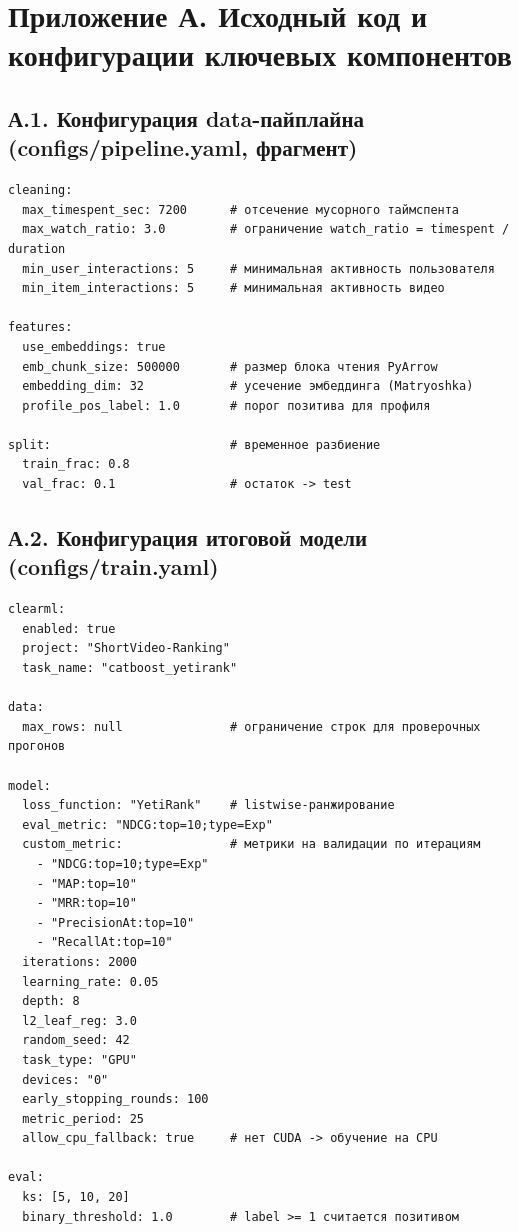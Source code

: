 \newpage
\section*{Приложение А. Исходный код и конфигурации ключевых компонентов}

\subsection*{А.1. Конфигурация data-пайплайна (configs/pipeline.yaml, фрагмент)}

\begin{lstlisting}[language={}, caption={Ключевые секции конфигурации data-этапов}, label={lst:pipeline-yaml}]
cleaning:
  max_timespent_sec: 7200      # отсечение мусорного таймспента
  max_watch_ratio: 3.0         # ограничение watch_ratio = timespent / duration
  min_user_interactions: 5     # минимальная активность пользователя
  min_item_interactions: 5     # минимальная активность видео

features:
  use_embeddings: true
  emb_chunk_size: 500000       # размер блока чтения PyArrow
  embedding_dim: 32            # усечение эмбеддинга (Matryoshka)
  profile_pos_label: 1.0       # порог позитива для профиля

split:                         # временное разбиение
  train_frac: 0.8
  val_frac: 0.1                # остаток -> test
\end{lstlisting}

\subsection*{А.2. Конфигурация итоговой модели (configs/train.yaml)}

\begin{lstlisting}[language={}, caption={Конфигурация обучения CatBoost-ранкера}, label={lst:train-yaml}]
clearml:
  enabled: true
  project: "ShortVideo-Ranking"
  task_name: "catboost_yetirank"

data:
  max_rows: null               # ограничение строк для проверочных прогонов

model:
  loss_function: "YetiRank"    # listwise-ранжирование
  eval_metric: "NDCG:top=10;type=Exp"
  custom_metric:               # метрики на валидации по итерациям
    - "NDCG:top=10;type=Exp"
    - "MAP:top=10"
    - "MRR:top=10"
    - "PrecisionAt:top=10"
    - "RecallAt:top=10"
  iterations: 2000
  learning_rate: 0.05
  depth: 8
  l2_leaf_reg: 3.0
  random_seed: 42
  task_type: "GPU"
  devices: "0"
  early_stopping_rounds: 100
  metric_period: 25
  allow_cpu_fallback: true     # нет CUDA -> обучение на CPU

eval:
  ks: [5, 10, 20]
  binary_threshold: 1.0        # label >= 1 считается позитивом
\end{lstlisting}

